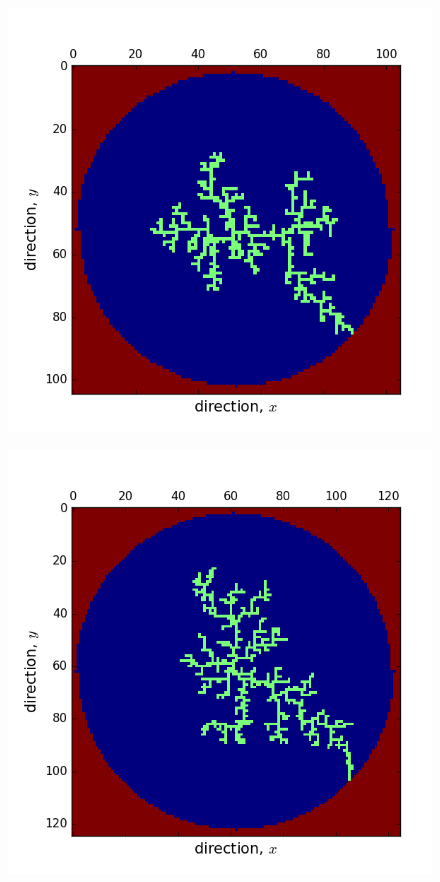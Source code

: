 \documentclass[12pt]{article}
\begin{document}
\begin{figure}[!htb]
  \caption{}\label{fig:dla2}
\endminipage\hfill \\
  \includegraphics[width=\linewidth]{oneDLAcluster52run1.png}
  \caption{}\label{fig:dla3}
\endminipage\hfill
{}
  \includegraphics[width=\linewidth]{oneDLAcluster62run1.png}

\end{figure}
\end{document}

